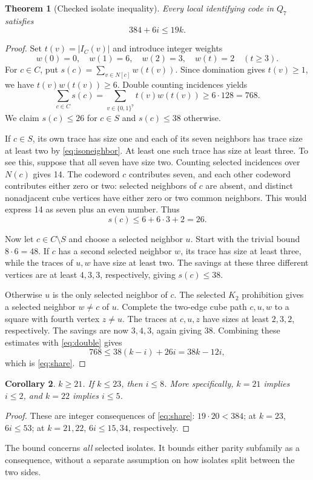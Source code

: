 \documentclass[11pt]{article}
\newtheorem{theorem}{Theorem}[section]
\newtheorem{corollary}[theorem]{Corollary}
\theoremstyle{definition}\newtheorem{definition}[theorem]{Definition}
\theoremstyle{remark}\newtheorem{remark}[theorem]{Remark}
\newcommand{\Q}{Q}
\newcommand{\card}[1]{\lvert #1\rvert}
\newcommand{\bits}{\{0,1\}}
\begin{document}
\begin{theorem}[Checked isolate inequality]\label{thm:share}
Every local identifying code in $\Q_7$ satisfies
\begin{equation}\label{eq:share}
 384+6i\le19k.
\end{equation}
\end{theorem}
\begin{proof}
Set $t(v)=\card{I_C(v)}$ and introduce integer weights
\[
 w(0)=0,\quad w(1)=6,\quad w(2)=3,\quad w(t)=2\quad(t\ge3).
\]
For $c\in C$, put $s(c)=\sum_{v\in N[c]}w(t(v))$. Since domination gives $t(v)\ge1$, we have $t(v)w(t(v))\ge6$. Double counting incidences yields
\begin{equation}\label{eq:double}
 \sum_{c\in C}s(c)=\sum_{v\in\bits^7}t(v)w(t(v))\ge6\cdot128=768.
\end{equation}
We claim $s(c)\le26$ for $c\in S$ and $s(c)\le38$ otherwise.

If $c\in S$, its own trace has size one and each of its seven neighbors has trace size at least two by \eqref{eq:isoneighbor}. At least one such trace has size at least three. To see this, suppose that all seven have size two. Counting selected incidences over $N(c)$ gives 14. The codeword $c$ contributes seven, and each other codeword contributes either zero or two: selected neighbors of $c$ are absent, and distinct nonadjacent cube vertices have either zero or two common neighbors. This would express 14 as seven plus an even number. Thus
\[
 s(c)\le6+6\cdot3+2=26.
\]

Now let $c\in C\setminus S$ and choose a selected neighbor $u$. Start with the trivial bound $8\cdot6=48$. If $c$ has a second selected neighbor $w$, its trace has size at least three, while the traces of $u,w$ have size at least two. The savings at these three different vertices are at least $4,3,3$, respectively, giving $s(c)\le38$.

Otherwise $u$ is the only selected neighbor of $c$. The selected $K_2$ prohibition gives a selected neighbor $w\ne c$ of $u$. Complete the two-edge cube path $c,u,w$ to a square with fourth vertex $z\ne u$. The traces at $c,u,z$ have sizes at least $2,3,2$, respectively. The savings are now $3,4,3$, again giving 38. Combining these estimates with \eqref{eq:double} gives
\[
 768\le38(k-i)+26i=38k-12i,
\]
which is \eqref{eq:share}.
\end{proof}
\begin{corollary}\label{cor:8}
$k\ge21$. If $k\le23$, then $i\le8$. More specifically, $k=21$ implies $i\le2$, and $k=22$ implies $i\le5$.
\end{corollary}
\begin{proof}
These are integer consequences of \eqref{eq:share}: $19\cdot20<384$; at $k=23$, $6i\le53$; at $k=21,22$, $6i\le15,34$, respectively.
\end{proof}
The bound concerns \emph{all} selected isolates. It bounds either parity subfamily as a consequence, without a separate assumption on how isolates split between the two sides.
\end{document}

